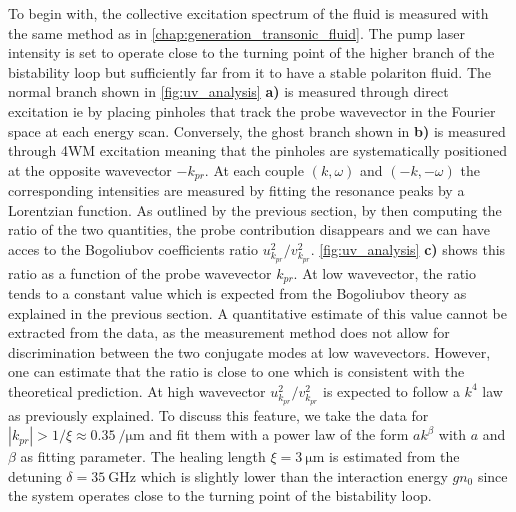 \bigskip

To begin with, the collective excitation spectrum of the fluid is measured with the same method as in \autoref{chap:generation_transonic_fluid}. The pump laser intensity is set to operate close to the turning point of the higher branch of the bistability loop but sufficiently far from it to have a stable polariton fluid. 
The normal branch shown in \autoref{fig:uv_analysis} \textbf{a)} is measured through direct excitation ie by placing pinholes that track the probe wavevector in the Fourier space at each energy scan.
 Conversely, the ghost branch shown in \textbf{b)} is measured through 4WM excitation meaning that the pinholes are systematically positioned at the opposite wavevector $-k_{pr}$. At each couple $(k,\omega)$ and $(-k, -\omega)$ the corresponding intensities are measured by fitting the resonance peaks 
by a Lorentzian function. As outlined by the previous section, by then computing the ratio of the two quantities, the probe contribution disappears and we can have acces to the Bogoliubov coefficients ratio $u_{k_{pr}}^2/v_{k_{pr}}^2$. 
\autoref{fig:uv_analysis} \textbf{c)} shows this ratio as a function of the probe wavevector $k_{pr}$. At low wavevector, the ratio tends to a constant value which is expected from the Bogoliubov theory as explained in the previous section. A quantitative estimate of this value cannot be extracted from the data, as the measurement method does not allow for discrimination between the two conjugate modes at low wavevectors.
However, one can estimate that the ratio is close to one which is consistent with the theoretical prediction.
At high wavevector $u_{k_{pr}}^2/v_{k_{pr}}^2$ is expected to follow a $k^4$ law as previously explained. To discuss this feature, we take the data for $|k_{pr}| > 1/\xi\approx\SI{0.35}{\per\micro\meter}$ and fit them with a power law of the form $ak^\beta$ with $a$ and $\beta$ as fitting parameter. The healing length $\xi=\SI{3}{\micro\meter}$ is estimated from the detuning $\delta =\SI{35}{\giga\hertz}$ which is slightly lower than the interaction energy $gn_0$ since the system operates close to the turning point of the bistability loop.

\bigskip


